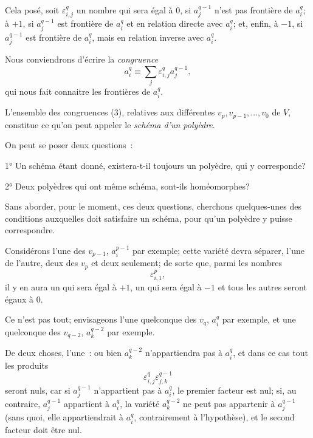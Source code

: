 \documentclass{article}
\begin{document}
Cela posé, soit $\varepsilon^{q}_{i,j}$ un nombre qui sera égal à 0, si $a^{q-1}_{j}$ n'est pas frontière de $a^{q}_{i}$; à $+1$, si $a^{q-1}_{j}$ est frontière de $a^{q}_{i}$ et en relation directe avec $a^{q}_{i}$; et, enfin, à $-1$, si $a^{q-1}_{j}$ est frontière de $a^{q}_{i}$, mais en relation inverse avec $a^{q}_{i}$.

Nous conviendrons d'écrire la \emph{congruence}
\[ a^{q}_{i} \equiv \sum_{j} \varepsilon^{q}_{i,j} a^{q-1}_{j}, \tag{3} \]
qui nous fait connaitre les frontières de $a^{q}_{i}$.

L'ensemble des congruences (3), relatives aux différentes $v_{p}, v_{p-1}, \ldots, v_{0}$ de $V$, constitue ce qu'on peut appeler le \emph{schéma d'un polyèdre}.

On peut se poser deux questions~:

1° Un schéma étant donné, existera-t-il toujours un polyèdre, qui y corresponde?

2° Deux polyèdres qui ont même schéma, sont-ils homéomorphes?

Sans aborder, pour le moment, ces deux questions, cherchons
quelques-unes des conditions auxquelles doit satisfaire un schéma, pour qu'un polyèdre y puisse correspondre.

Considérons l'une des $v_{p-1}$, $a^{p-1}_{i}$ par exemple; cette variété devra séparer, l'une de l'autre, deux des $v_{p}$ et deux seulement; de sorte que, parmi les nombres
\[ \varepsilon^{p}_{i,1}, \]
il y en aura un qui sera égal à $+1$, un qui sera égal à $-1$ et tous les autres seront égaux à 0.

Ce n'est pas tout; envisageons l'une quelconque des $v_{q}$, $a^{q}_{i}$ par exemple, et une quelconque des $v_{q-2}$, $a^{q-2}_{k}$ par exemple.

De deux choses, l'une~: ou bien $a^{q-2}_{k}$ n'appartiendra pas à $a^{q}_{i}$, et dans ce cas tout les produits
\[ \varepsilon^{q}_{i,j} \varepsilon^{q-1}_{j,k} \tag{4} \]
seront nuls, car si $a^{q-1}_{j}$ n'appartient pas à $a^{q}_{i}$, le premier facteur est nul; si, au contraire, $a^{q-1}_{j}$ appartient à $a^{q}_{i}$, la variété $a^{q-2}_{k}$ ne peut pas appartenir à $a^{q-1}_{j}$ (sans quoi, elle appartiendrait à $a^{q}_{i}$, contrairement à l'hypothèse), et le second facteur doit être nul.
\end{document}
